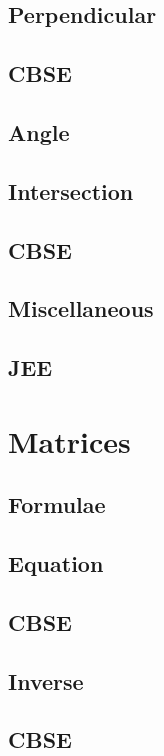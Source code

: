 \documentclass[journal]{IEEEtran}
\begin{document}
\subsection{Perpendicular}

\subsection{CBSE}

\subsection{Angle}

\subsection{Intersection}

\subsection{CBSE}

\subsection{Miscellaneous }

\subsection{JEE}

\newpage
\section{Matrices}
\subsection{Formulae}

\subsection{Equation}

\subsection{CBSE}

\subsection{Inverse}

\subsection{CBSE}

\end{document}
